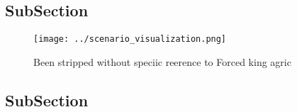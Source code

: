 \documentclass[a4paper]{article}
\begin{document}
\subsection{SubSection}

\begin{figure}
\centering
\texttt{[image: ../scenario\_visualization.png]}
\caption{Been stripped without speciic reerence to Forced king agric
}
\end{figure}
 
\subsection{SubSection}
\end{document}

